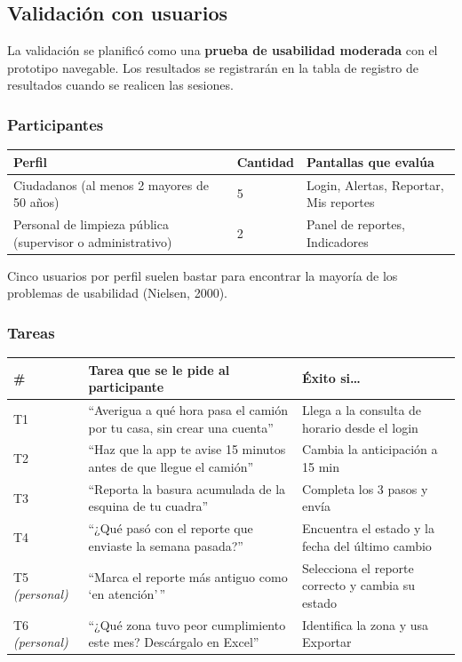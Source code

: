 \documentclass[11pt,a4paper]{article}
\begin{document}
\subsection{Validación con usuarios}

La validación se planificó como una \textbf{prueba de usabilidad moderada} con el prototipo navegable. Los resultados se registrarán en la tabla de registro de resultados cuando se realicen las sesiones.

\subsubsection*{Participantes}

\begin{center}
\begin{tabular}{L{6.6cm} C{2cm} L{6.4cm}}
\toprule
\textbf{Perfil} & \textbf{Cantidad} & \textbf{Pantallas que evalúa} \\
\midrule
Ciudadanos (al menos 2 mayores de 50 años) & 5 & Login, Alertas, Reportar, Mis reportes \\
Personal de limpieza pública (supervisor o administrativo) & 2 & Panel de reportes, Indicadores \\
\bottomrule
\end{tabular}
\end{center}

Cinco usuarios por perfil suelen bastar para encontrar la mayoría de los problemas de usabilidad (Nielsen, 2000).

\subsubsection*{Tareas}

{\small
\begin{longtable}{L{2.2cm} L{7.8cm} L{5.4cm}}
\toprule
\textbf{\#} & \textbf{Tarea que se le pide al participante} & \textbf{Éxito si\ldots} \\
\midrule
\endhead
T1 & ``Averigua a qué hora pasa el camión por tu casa, sin crear una cuenta'' & Llega a la consulta de horario desde el login \\
T2 & ``Haz que la app te avise 15 minutos antes de que llegue el camión'' & Cambia la anticipación a 15 min \\
T3 & ``Reporta la basura acumulada de la esquina de tu cuadra'' & Completa los 3 pasos y envía \\
T4 & ``¿Qué pasó con el reporte que enviaste la semana pasada?'' & Encuentra el estado y la fecha del último cambio \\
T5 \textit{(personal)} & ``Marca el reporte más antiguo como `en atención'\,'' & Selecciona el reporte correcto y cambia su estado \\
T6 \textit{(personal)} & ``¿Qué zona tuvo peor cumplimiento este mes? Descárgalo en Excel'' & Identifica la zona y usa Exportar \\
\bottomrule
\end{longtable}
}
\end{document}
